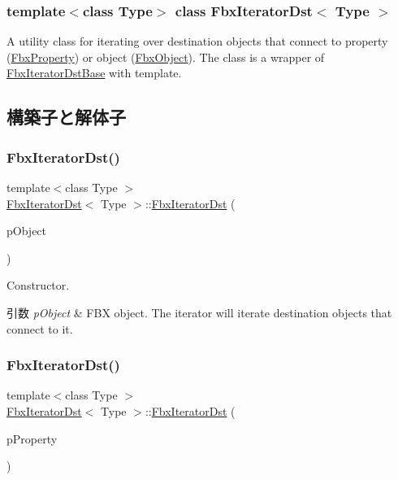 \subsubsection*{template$<$class Type$>$\newline
class Fbx\+Iterator\+Dst$<$ Type $>$}

A utility class for iterating over destination objects that connect to property (\hyperlink{class_fbx_property}{Fbx\+Property}) or object (\hyperlink{class_fbx_object}{Fbx\+Object}). The class is a wrapper of \hyperlink{class_fbx_iterator_dst_base}{Fbx\+Iterator\+Dst\+Base} with template. 

\subsection{構築子と解体子}
\mbox{\label{class_fbx_iterator_dst_a620226076a20ced72d2e4e3e902e447b}} 
\subsubsection{\texorpdfstring{Fbx\+Iterator\+Dst()}{FbxIteratorDst()}\hspace{0.1cm}{\footnotesize\ttfamily [1/2]}}
{\footnotesize\ttfamily template$<$class Type $>$ \\
\hyperlink{class_fbx_iterator_dst}{Fbx\+Iterator\+Dst}$<$ Type $>$\+::\hyperlink{class_fbx_iterator_dst}{Fbx\+Iterator\+Dst} (\begin{DoxyParamCaption}\item[{\hyperlink{class_fbx_object}{Fbx\+Object} $\ast$}]{p\+Object }\end{DoxyParamCaption})}

Constructor. 
\begin{DoxyParams}{引数}
{\em p\+Object} & F\+BX object. The iterator will iterate destination objects that connect to it. \\
\hline
\end{DoxyParams}
\mbox{\label{class_fbx_iterator_dst_a58a64aa620eda5b7a58aef5198484fde}} 
\subsubsection{\texorpdfstring{Fbx\+Iterator\+Dst()}{FbxIteratorDst()}\hspace{0.1cm}{\footnotesize\ttfamily [2/2]}}
{\footnotesize\ttfamily template$<$class Type $>$ \\
\hyperlink{class_fbx_iterator_dst}{Fbx\+Iterator\+Dst}$<$ Type $>$\+::\hyperlink{class_fbx_iterator_dst}{Fbx\+Iterator\+Dst} (\begin{DoxyParamCaption}\item[{\hyperlink{class_fbx_property}{Fbx\+Property} \&}]{p\+Property }\end{DoxyParamCaption})}

